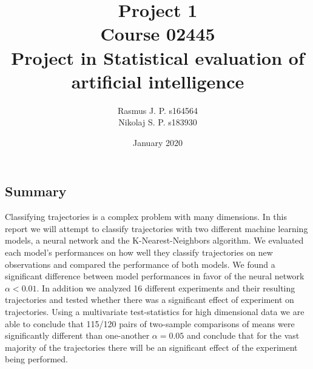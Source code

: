 \documentclass{article}
\begin{document}
\begin{titlepage}
	
	
	\title{Project 1 \\ Course 02445 \\ Project in Statistical evaluation of \\ artificial intelligence }
	\author{Rasmus J. P. s164564 \\ Nikolaj S. P. s183930}
	\date{January 2020}
	\maketitle
	
\subsection*{Summary}
Classifying trajectories is a complex problem with many dimensions. In this report we will attempt to classify trajectories with two different machine learning models, a neural network and the K-Nearest-Neighbors algorithm. We evaluated each model's performances on how well they classify trajectories on new observations and compared the performance of both models. We found a significant difference between model performances in favor of the neural network $\alpha < 0.01$. In addition we analyzed 16 different experiments and their resulting trajectories and tested whether there was a significant effect of experiment on trajectories. Using a multivariate test-statistics for high dimensional data we are able to conclude that 115/120 pairs of two-sample comparisons of means were significantly different than one-another $\alpha = 0.05$ and conclude that for the vast majority of the trajectories there will be an significant effect of the experiment being performed.

\end{titlepage}
\end{document}

